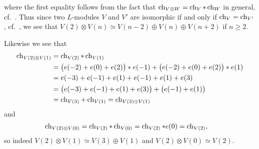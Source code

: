 where the first equality follows from the fact that $\operatorname{ch}_{V\otimes W}=\operatorname{ch}_V * \operatorname{ch}_W$ in general, cf.\ \cite[125]{humphrey}. Thus since two $L$-modules $V$ and $V'$ are isomorphic if and only if $\operatorname{ch}_V=\operatorname{ch}_{V'}$, cf.\ \cite[90]{jantzen}, we see that $V(2)\otimes V(n) \simeq V(n-2)\oplus V(n)\oplus V(n+2)$ if $n\geq 2$.

Likewise we see that
\begin{align*}
  \operatorname{ch}_{V(2)\otimes V(1)} &= \operatorname{ch}_{V(2)}*\operatorname{ch}_{V(1)} \\
  &= \bigl(e(-2)+e(0)+e(2)\bigr)*e(-1) + \bigl(e(-2)+e(0)+e(2)\bigr)*e(1) \\
                         &= e(-3)+e(-1)+e(1)+e(-1)+e(1)+e(3) \\
                         &= \bigl(e(-3)+e(-1)+e(1)+e(3)\bigr) + \bigl(e(-1)+e(1)\bigr) \\
  &= \operatorname{ch}_{V(3)} + \operatorname{ch}_{V(1)} = \operatorname{ch}_{V(3)\oplus V(1)}
\end{align*}
and
\begin{align*}
  \operatorname{ch}_{V(2)\otimes V(0)} &= \operatorname{ch}_{V(2)}*\operatorname{ch}_{V(0)} = \operatorname{ch}_{V(2)}*e(0) = \operatorname{ch}_{V(2)},
\end{align*}
so indeed $V(2)\otimes V(1)\simeq V(3)\oplus V(1)$ and $V(2)\otimes V(0)\simeq V(2)$. 

